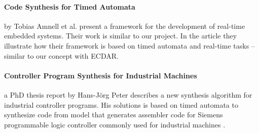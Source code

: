 \paragraph{Code Synthesis for Timed Automata}
by Tobias Amnell et al. present a framework for the development of real-time
embedded systems\cite{Amnell:2002:CST:779110.779112}. Their work is similar to
our project. In the article they illustrate how their framework is based on timed
automata and real-time tasks -- similar to our concept with ECDAR.

\paragraph{Controller Program Synthesis for Industrial Machines}
a PhD thesis report by Hans-Jörg Peter describes a new synthesis algorithm for
industrial controller programs. His solutions is based on timed automata to
synthesize code from model that generates assembler code for Siemens
programmable logic controller commonly used for industrial
machines \cite{controller-program-synthesis:2005}.
